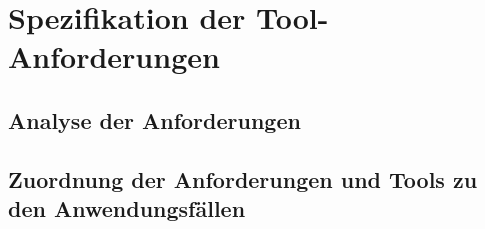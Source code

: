 \chapter{Spezifikation der Tool-Anforderungen}

\section{Analyse der Anforderungen}

\section{Zuordnung der Anforderungen und Tools zu den Anwendungsfällen}